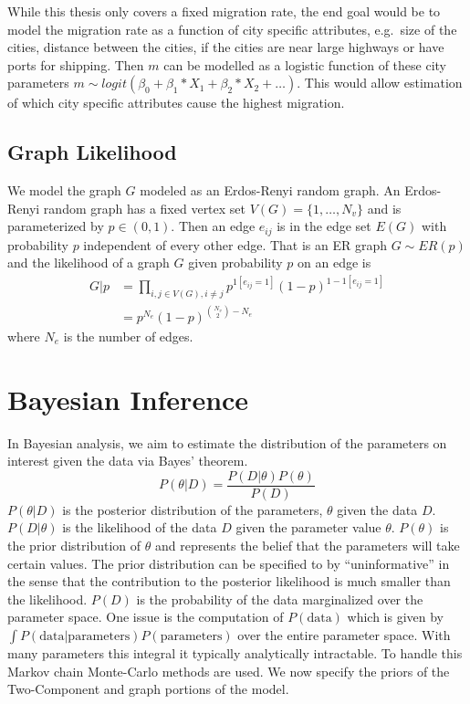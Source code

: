 \documentclass[]{article}
\numberwithin{equation}{section}
\begin{document}
While this thesis only covers a fixed migration rate, the end goal would
be to model the migration rate as a function of city specific
attributes, e.g.~size of the cities, distance between the cities, if the
cities are near large highways or have ports for shipping. Then \(m\)
can be modelled as a logistic function of these city parameters
\(m \sim logit(\beta_0 + \beta_1*X_1 + \beta_2*X_2 + \dots)\). This
would allow estimation of which city specific attributes cause the
highest migration.

\hypertarget{graph-likelihood}{%
\subsection{Graph Likelihood}\label{graph-likelihood}}

We model the graph \(G\) modeled as an Erdos-Renyi random graph. An
Erdos-Renyi random graph has a fixed vertex set
\(V(G) = \{1, \dots, N_v\}\) and is parameterized by \(p \in (0,1)\).
Then an edge \(e_{ij}\) is in the edge set \(E(G)\) with probability
\(p\) independent of every other edge. That is an ER graph
\(G \sim ER(p)\) and the likelihood of a graph \(G\) given probability
\(p\) on an edge is
\[\begin{aligned} G|p & = \prod_{i,j \in V(G),i \neq j} p^{1[e_{ij}=1]}(1-p)^{1-1[e_{ij}=1]} 
\\ & = p^{N_e}(1-p)^{\binom{N_v}{2}-N_e} \end{aligned}\] where \(N_e\)
is the number of edges.

\hypertarget{bayesian-inference}{%
\section{Bayesian Inference}\label{bayesian-inference}}

In Bayesian analysis, we aim to estimate the distribution of the
parameters on interest given the data via Bayes' theorem.
\[ P(\theta|D) = \frac{P(D|\theta)P(\theta)}{P(D)} \] \(P(\theta|D)\) is
the posterior distribution of the parameters, \(\theta\) given the data
\(D\). \(P(D|\theta)\) is the likelihood of the data \(D\) given the
parameter value \(\theta\). \(P(\theta)\) is the prior distribution of
\(\theta\) and represents the belief that the parameters will take
certain values. The prior distribution can be specified to by
``uninformative'' in the sense that the contribution to the posterior
likelihood is much smaller than the likelihood. \(P(D)\) is the
probability of the data marginalized over the parameter space. One issue
is the computation of \(P(\text{data})\) which is given by
\(\int P(\text{data}|\text{parameters})P(\text{parameters})\) over the
entire parameter space. With many parameters this integral it typically
analytically intractable. To handle this Markov chain Monte-Carlo
methods are used. We now specify the priors of the Two-Component and
graph portions of the model.
\end{document}
